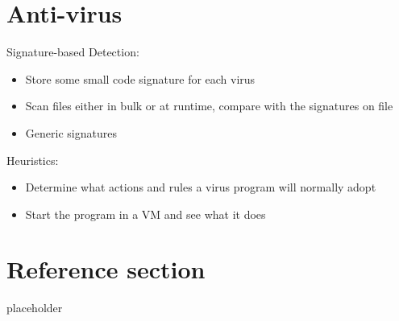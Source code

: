 \documentclass{article}
\begin{document}
\section{Anti-virus}
\begin{flushleft}
Signature-based Detection:
\begin{itemize}
  \item Store some small code signature for each virus 
  \item Scan files either in bulk or at runtime, compare with the signatures on file 
  \item Generic signatures
\end{itemize}
Heuristics:
\begin{itemize}
  \item Determine what actions and rules a virus program will normally adopt 
  \item Start the program in a VM and see what it does 
\end{itemize}
\end{flushleft}

\pagebreak
\section*{Reference section} \label{sec:reference}
\begin{description}
	\item[placeholder] \hfill \\
\end{description}
\end{document}
